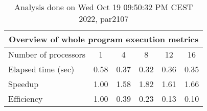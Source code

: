 \begin{table}[h]
\begin{center}
\begin{tabular}{|l|c|c|c|c|c|}
\hline
\multicolumn{6}{|c|}{Overview of whole program execution metrics} \\
\hline
\hline
Number of processors & 1 & 4 & 8 & 12 & 16 \\
\hline
Elapsed time (sec)      &       0.58 &       0.37 &       0.32 &       0.36 &       0.35 \\
\hline
Speedup                 &       1.00 &       1.58 &       1.82 &       1.61 &       1.66 \\
\hline
Efficiency              &       1.00 &       0.39 &       0.23 &       0.13 &       0.10 \\
\hline
\end{tabular}
\end{center}
\caption{ Analysis done on Wed Oct 19 09:50:32 PM CEST 2022, par2107}
\end{table}
